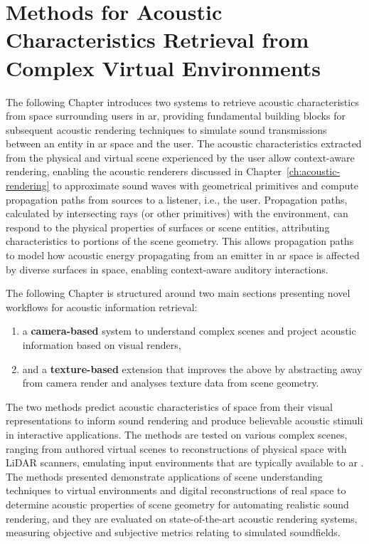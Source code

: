 \chapter{Methods for Acoustic Characteristics Retrieval from Complex Virtual Environments}\label{ch:materials} %
The following Chapter introduces two systems to retrieve acoustic characteristics from space surrounding users in \acrshort{ar}, providing fundamental building blocks for subsequent acoustic rendering techniques to simulate sound transmissions between an entity in \acrshort{ar} space and the user. The acoustic characteristics extracted from the physical and virtual scene experienced by the user allow context-aware rendering, enabling the acoustic renderers discussed in Chapter~\ref{ch:acoustic-rendering} to approximate sound waves with geometrical primitives and compute propagation paths from sources to a listener, i.e., the user. Propagation paths, calculated by intersecting rays (or other primitives) with the environment, can respond to the physical properties of surfaces or scene entities, attributing characteristics to portions of the scene geometry. This allows propagation paths to model how acoustic energy propagating from an emitter in \acrshort{ar} space is affected by diverse surfaces in space, enabling context-aware auditory interactions.\par
The following Chapter is structured around two main sections presenting novel workflows for acoustic information retrieval:
\begin{enumerate}
    \item a \textbf{camera-based} system to understand complex scenes and project acoustic information based on visual renders,
    \item and a \textbf{texture-based} extension that improves the above by abstracting away from camera render and analyses texture data from scene geometry.
\end{enumerate}
The two methods predict acoustic characteristics of space from their visual representations to inform sound rendering and produce believable acoustic stimuli in interactive applications. The methods are tested on various complex scenes, ranging from authored virtual scenes to reconstructions of physical space with LiDAR scanners, emulating input environments that are typically available to \acrshort{ar} . The methods presented demonstrate applications of scene understanding techniques to virtual environments and digital reconstructions of real space to determine acoustic properties of scene geometry for automating realistic sound rendering, and they are evaluated on state-of-the-art acoustic rendering systems, measuring objective and subjective metrics relating to simulated soundfields.\par

